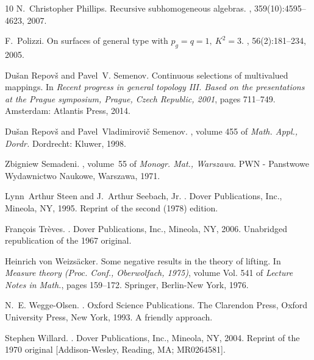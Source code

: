 \documentclass[11pt,leqno]{article}
\theoremstyle{plain}
\theoremstyle{plain}
\theoremstyle{plain}
\numberwithin{equation}{section}
\theoremstyle{nonumberplain}
\newcommand\1{{\bf 1}}
\begin{document}
\begin{thebibliography}{10}
N.~Christopher Phillips.
\newblock Recursive subhomogeneous algebras.
, 359(10):4595--4623, 2007.

F.~Polizzi.
\newblock On surfaces of general type with {$p_g=q=1,\ K^2=3$}.
, 56(2):181--234, 2005.

Du{\v{s}}an Repov{\v{s}} and Pavel~V. Semenov.
\newblock Continuous selections of multivalued mappings.
\newblock In {\em Recent progress in general topology III. Based on the
  presentations at the Prague symposium, Prague, Czech Republic, 2001}, pages
  711--749. Amsterdam: Atlantis Press, 2014.

Du{\v{s}}an Repov{\v{s}} and Pavel~Vladimirovi{\v{c}} Semenov.
, volume 455 of
  {\em Math. Appl., Dordr.}
\newblock Dordrecht: Kluwer, 1998.

Zbigniew Semadeni.
, volume~55 of
  {\em Monogr. Mat., Warszawa}.
\newblock PWN - Panstwowe Wydawnictwo Naukowe, Warszawa, 1971.

Lynn~Arthur Steen and J.~Arthur Seebach, Jr.
.
\newblock Dover Publications, Inc., Mineola, NY, 1995.
\newblock Reprint of the second (1978) edition.

Fran\c{c}ois Tr\`eves.
.
\newblock Dover Publications, Inc., Mineola, NY, 2006.
\newblock Unabridged republication of the 1967 original.

Heinrich von Weizs\"acker.
\newblock Some negative results in the theory of lifting.
\newblock In {\em Measure theory ({P}roc. {C}onf., {O}berwolfach, 1975)},
  volume Vol. 541 of {\em Lecture Notes in Math.}, pages 159--172. Springer,
  Berlin-New York, 1976.

N.~E. Wegge-Olsen.
.
\newblock Oxford Science Publications. The Clarendon Press, Oxford University
  Press, New York, 1993.
\newblock A friendly approach.

Stephen Willard.
.
\newblock Dover Publications, Inc., Mineola, NY, 2004.
\newblock Reprint of the 1970 original [Addison-Wesley, Reading, MA;
  MR0264581].

\end{thebibliography}

\Addresses
\end{document}
